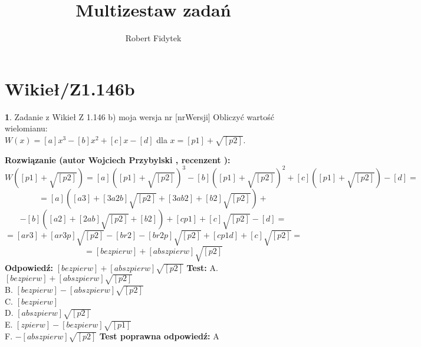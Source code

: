 \documentclass[12pt, a4paper]{article}
\title{Multizestaw zadań}
\author{Robert Fidytek}
\date{}
\theoremstyle{definition} %
\newtheorem{zad}{}
\newcommand{\kategoria}[1]{\section{#1}} %
\newcommand{\zadStart}[1]{\begin{zad}#1\newline} %
\newcommand{\zadStop}{\end{zad}}   %
\newcommand{\rozwStart}[2]{\noindent \textbf{Rozwiązanie (autor #1 , recenzent #2): }\newline} %
\newcommand{\rozwStop}{\newline}                                            %
\newcommand{\odpStart}{\noindent \textbf{Odpowiedź:}\newline}    %
\newcommand{\odpStop}{\newline}                                             %
\newcommand{\testStart}{\noindent \textbf{Test:}\newline} %
\newcommand{\testStop}{\newline} %
\newcommand{\kluczStart}{\noindent \textbf{Test poprawna odpowiedź:}\newline} %
\newcommand{\kluczStop}{\newline} %
\begin{document}
\maketitle


\kategoria{Wikieł/Z1.146b}
\zadStart{Zadanie z Wikieł Z 1.146 b) moja wersja nr [nrWersji]}
Obliczyć wartość wielomianu:\\ $W(x)=[a]x^{3}-[b]x^{2}+[c]x-[d]$ dla $x=[p1]+\sqrt{[p2]}$.
\zadStop
\rozwStart{Wojciech Przybylski}{}
$$W([p1]+\sqrt{[p2]})=[a]([p1]+\sqrt{[p2]})^{3}-[b]([p1]+\sqrt{[p2]})^{2}+[c]([p1]+\sqrt{[p2]})-[d]=$$
$$=[a]([a3]+[3a2b]\sqrt{[p2]}+[3ab2]+[b2]\sqrt{[p2]})+$$
$$-[b]([a2]+[2ab]\sqrt{[p2]}+[b2])+[cp1]+[c]\sqrt{[p2]}-[d]=$$
$$=[ar3]+[ar3p]\sqrt{[p2]}-[br2]-[br2p]\sqrt{[p2]}+[cp1d]+[c]\sqrt{[p2]}=$$
$$=[bezpierw]+[abszpierw]\sqrt{[p2]}$$
\rozwStop
\odpStart
$[bezpierw]+[abszpierw]\sqrt{[p2]}$
\odpStop
\testStart
A. $[bezpierw]+[abszpierw]\sqrt{[p2]}$\\
B. $[bezpierw]-[abszpierw]\sqrt{[p2]}$\\
C. $[bezpierw]$\\
D. $[abszpierw]\sqrt{[p2]}$\\
E. $[zpierw]-[bezpierw]\sqrt{[p1]}$\\
F. $-[abszpierw]\sqrt{[p2]}$
\testStop
\kluczStart
A
\kluczStop
\end{document}
